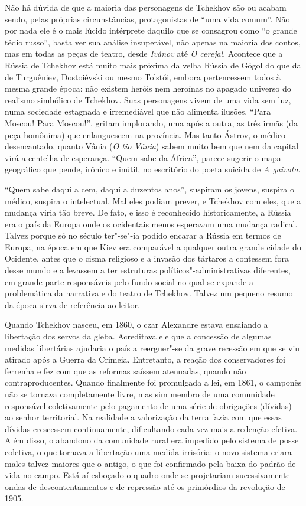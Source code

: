 Não há dúvida de que a maioria das personagens de Tchekhov são ou acabam
sendo, pelas próprias circunstâncias, protagonistas de ``uma vida
comum''. Não por nada ele é o mais lúcido intérprete daquilo que se
consagrou como ``o grande tédio russo'', basta ver sua análise
insuperável, não apenas na maioria dos contos, mas em todas as peças de
teatro, desde \emph{Ivánov} até \emph{O cerejal}. Acontece que a Rússia
de Tchekhov está muito mais próxima da velha Rússia de Gógol do que da
de Turguêniev, Dostoiévski ou mesmo Tolstói, embora pertencessem todos à
mesma grande época: não existem heróis nem heroínas no apagado universo
do realismo simbólico de Tchekhov. Suas personagens vivem de uma vida
sem luz, numa sociedade estagnada e irremediável que não alimenta
ilusões. ``Para Moscou! Para Moscou!'', gritam implorando, uma após a
outra, as três irmãs (da peça homônima) que enlanguescem na província.
Mas tanto Ástrov, o médico desencantado, quanto Vânia (\emph{O tio Vânia})
sabem muito bem que nem da capital virá a centelha de esperança. ``Quem
sabe da África'', parece sugerir o mapa geográfico que pende, irônico
e inútil, no escritório do poeta suicida de \emph{A gaivota}.

``Quem sabe daqui a cem, daqui a duzentos anos'', suspiram os jovens,
suspira o médico, suspira o intelectual. Mal eles podiam prever, e
Tchekhov com eles, que a mudança viria tão breve. De fato, e isso é
reconhecido historicamente, a Rússia era o país da Europa onde os
ocidentais menos esperavam uma mudança radical. Talvez porque só no
século  ter"-se"-ia podido encarar a Rússia em termos de Europa, na época
em que Kiev era comparável a qualquer outra grande cidade do Ocidente,
antes que o cisma religioso e a invasão dos tártaros a contessem fora
desse mundo e a levassem a ter estruturas políticos"-administrativas
diferentes, em grande parte responsáveis pelo fundo social no qual se
expande a problemática da narrativa e do teatro de Tchekhov. Talvez um
pequeno resumo da época sirva de referência ao leitor.

Quando Tchekhov nasceu, em 1860, o czar Alexandre  estava ensaiando a
libertação dos servos da gleba. Acreditava ele que a concessão de
algumas medidas libertárias ajudaria o país a reerguer"-se da grave
recessão em que se viu atirado após a Guerra da Crimeia. Entretanto, a
reação dos conservadores foi ferrenha e fez com que as reformas saíssem
atenuadas, quando não contraproducentes. Quando finalmente foi
promulgada a lei, em 1861, o camponês não se tornava completamente
livre, mas sim membro de uma comunidade responsável coletivamente pelo
pagamento de uma série de obrigações (dívidas) ao senhor territorial. Na realidade a
valorização da terra fazia com que essas dívidas crescessem continuamente,
dificultando cada vez mais a redenção efetiva. Além disso, o abandono da
comunidade rural era impedido pelo sistema de posse coletiva, o que
tornava a libertação uma medida irrisória: o novo sistema criara males talvez maiores que o
antigo, o que foi confirmado pela baixa do padrão de vida no campo. Está aí esboçado o quadro onde se
projetariam sucessivamente ondas de descontentamentos e de repressão até
os primórdios da revolução de 1905.

